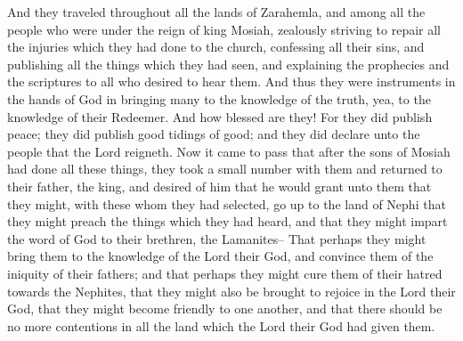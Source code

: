And they traveled throughout all the lands of Zarahemla, and among all the people who were under the reign of king Mosiah, zealously striving to repair all the injuries which they had done to the church, confessing all their sins, and publishing all the things which they had seen, and explaining the prophecies and the scriptures to all who desired to hear them.
\bverse \iffalse And thus they were instruments in the hands of God in bringing many to the knowledge of the truth, yea, to the knowledge of their Redeemer. \fi
And thus they were instruments in the hands of God in bringing many to the knowledge of the truth, yea, to the knowledge of their Redeemer.
\bverse \iffalse And how blessed are they! For they did publish peace; they did publish good tidings of good; and they did declare unto the people that the Lord reigneth. \fi
And how blessed are they! For they did publish peace; they did publish good tidings of good; and they did declare unto the people that the Lord reigneth.
\bchapter
\bverse \iffalse Now it came to pass that after the sons of Mosiah had done all these things, they took a small number with them and returned to their father, the king, and desired of him that he would grant unto them that they might, with these whom they had selected, go up to the land of Nephi that they might preach the things which they had heard, and that they might impart the word of God to their brethren, the Lamanites-- \fi
Now it came to pass that after the sons of Mosiah had done all these things, they took a small number with them and returned to their father, the king, and desired of him that he would grant unto them that they might, with these whom they had selected, go up to the land of Nephi that they might preach the things which they had heard, and that they might impart the word of God to their brethren, the Lamanites--
\bverse \iffalse That perhaps they might bring them to the knowledge of the Lord their God, and convince them of the iniquity of their fathers; and that perhaps they might cure them of their hatred towards the Nephites, that they might also be brought to rejoice in the Lord their God, that they might become friendly to one another, and that there should be no more contentions in all the land which the Lord their God had given them. \fi
That perhaps they might bring them to the knowledge of the Lord their God, and convince them of the iniquity of their fathers; and that perhaps they might cure them of their hatred towards the Nephites, that they might also be brought to rejoice in the Lord their God, that they might become friendly to one another, and that there should be no more contentions in all the land which the Lord their God had given them.
